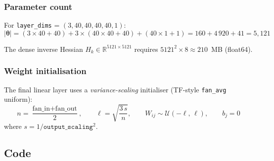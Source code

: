 \documentclass[11pt,a4paper]{article}
\begin{document}
\subsubsection*{Parameter count}

For \texttt{layer\_dims} = $(3, 40, 40, 40, 40, 1)$:
\[
  |\bm\theta| = (3\!\times\!40 {+} 40) + 3 \times (40\!\times\!40 {+} 40) + (40\!\times\!1 {+} 1)
  = 160 + 4\,920 + 41 = 5{,}121
\]

The dense inverse Hessian $H_k \in \mathbb{R}^{5121 \times 5121}$
requires $5121^2 \times 8 \approx 210$~MB (float64).

\subsubsection*{Weight initialisation}

The final linear layer uses a \emph{variance-scaling} initialiser
(TF-style \texttt{fan\_avg} uniform):
\begin{equation}
  n = \frac{\text{fan\_in} + \text{fan\_out}}{2}, \qquad
  \ell = \sqrt{\frac{3\,s}{n}}, \qquad
  W_{ij} \sim \mathcal{U}(-\ell,\,\ell), \qquad
  b_j = 0
\label{eq:init}
\end{equation}
where $s = 1/\texttt{output\_scaling}^2$.

\subsection*{Code}
\end{document}

